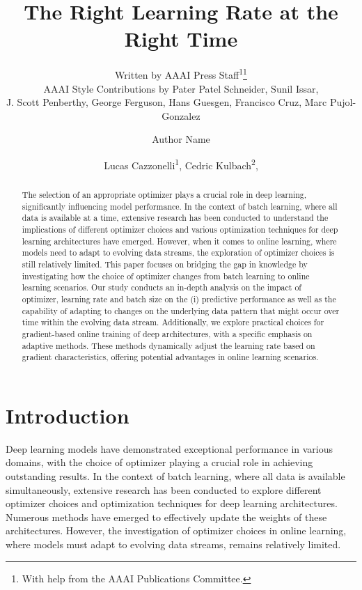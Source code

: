 \documentclass[letterpaper]{article} %
\author{
    Written by AAAI Press Staff\textsuperscript{\rm 1}\thanks{With help from the AAAI Publications Committee.}\\
    AAAI Style Contributions by Pater Patel Schneider,
    Sunil Issar,\\
    J. Scott Penberthy,
    George Ferguson,
    Hans Guesgen,
    Francisco Cruz\equalcontrib,
    Marc Pujol-Gonzalez\equalcontrib}
\author{
    Author Name
}
\title{The Right Learning Rate at the Right Time}
\author{
    Lucas Cazzonelli\textsuperscript{\rm 1},
    Cedric Kulbach\textsuperscript{\rm 2},
}
\begin{document}
\maketitle


\begin{abstract}

	\noindent The selection of an appropriate optimizer plays a crucial role in deep learning, significantly influencing model performance.
	In the context of batch learning, where all data is available at a time, extensive research has been conducted to understand the implications of different optimizer choices and various optimization techniques for deep learning architectures have emerged.
	However, when it comes to online learning, where models need to adapt to evolving data streams, the exploration of optimizer choices is still relatively limited.
	This paper focuses on bridging the gap in knowledge by investigating how the choice of optimizer  changes from batch learning to online learning scenarios.
	Our study conducts an in-depth analysis on the impact of optimizer, learning rate and batch size on the (i) predictive performance as well as the capability of adapting to changes on the underlying data pattern that might occur over time within the evolving data stream.
	Additionally, we explore practical choices for gradient-based online training of deep architectures, with a specific emphasis on adaptive methods.
	These methods dynamically adjust the learning rate based on gradient characteristics, offering potential advantages in online learning scenarios.

\end{abstract}

\section{Introduction}
Deep learning models have demonstrated exceptional performance in various domains, with the choice of optimizer playing a crucial role in achieving outstanding results.
In the context of batch learning, where all data is available simultaneously, extensive research has been conducted to explore different optimizer choices and optimization techniques for deep learning architectures.
Numerous methods have emerged to effectively update the weights of these architectures.
However, the investigation of optimizer choices in online learning, where models must adapt to evolving data streams, remains relatively limited.
\end{document}
